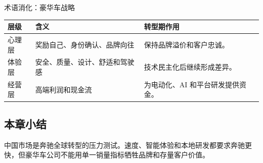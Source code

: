 \begin{knowledgebox}{术语消化：豪华车战略}
\noindent\begin{tabularx}{\textwidth}{p{}p{}X}
\toprule
层级 & 含义 & 转型期作用 \\
\midrule
心理层 & 奖励自己、身份确认、品牌向往 & 保持品牌溢价和客户忠诚。 \\
体验层 & 安全、质量、设计、舒适和驾驶感 & 技术民主化后继续形成差异。 \\
经营层 & 高端利润和现金流 & 为电动化、AI 和平台研发提供资金。 \\
\bottomrule
\end{tabularx}
\end{knowledgebox}

\subsection{本章小结}

中国市场是奔驰全球转型的压力测试。速度、智能体验和本地研发都要求奔驰更快，但豪华车公司不能用单一销量指标牺牲品牌和存量客户价值。

